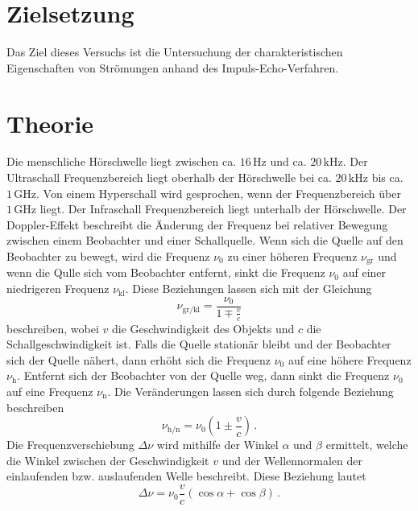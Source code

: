 \section{Zielsetzung}
\label{sec:Zielsetzung}
\nocite{anleitungUS3}
Das Ziel dieses Versuchs ist die Untersuchung der charakteristischen Eigenschaften von Strömungen anhand des Impuls-Echo-Verfahren.

\section{Theorie}
\label{sec:Theorie}
Die menschliche Hörschwelle liegt zwischen ca. $16\,\unit{\hertz}$ und ca. $20\,\unit{\kilo\hertz}$. Der Ultraschall Frequenzbereich
liegt oberhalb der Hörschwelle bei ca. $20\,\unit{\kilo\hertz}$ bis ca. $1\,\unit{\giga\hertz}$. Von einem Hyperschall wird gesprochen, wenn
der Frequenzbereich über $1\,\unit{\giga\hertz}$ liegt. Der Infraschall Frequenzbereich liegt unterhalb der Hörschwelle. 
Der Doppler-Effekt beschreibt die Änderung der Frequenz bei relativer Bewegung zwischen einem Beobachter und einer Schallquelle. 
Wenn sich die Quelle auf den Beobachter zu bewegt, wird die Frequenz $\nu_0$ zu einer höheren Frequenz $\nu_{\text{gr}}$ und wenn die
Qulle sich vom Beobachter entfernt, sinkt die Frequenz $\nu_0$ auf einer niedrigeren Frequenz $\nu_{\text{kl}}$. Diese Beziehungen lassen sich mit
der Gleichung
\begin{equation}
    \nu_{\text{gr/kl}} = \frac{\nu_0}{1 \mp \frac{v}{c}}
    \label{eqn:Frequenz_Quelle-Beobachter}
\end{equation}
beschreiben, wobei $v$ die Geschwindigkeit des Objekts und $c$ die Schallgeschwindigkeit ist. Falls die Quelle stationär bleibt und der Beobachter sich der Quelle nähert, dann erhöht sich die Frequenz $\nu_0$ auf eine höhere Frequenz
$\nu_{\text{h}}$. Entfernt sich der Beobachter von der Quelle weg, dann sinkt die Frequenz $\nu_0$ auf eine Frequenz $\nu_{\text{n}}$. Die Veränderungen lassen sich
durch folgende Beziehung beschreiben 
\begin{equation}
    \nu_{\text{h/n}} = \nu_0 \left( 1 \pm \frac{v}{c}\right)\,.
    \label{eqn:Frequenz_Beobachter-Quelle}
\end{equation}
Die Frequenzverschiebung $\Delta \nu$ wird mithilfe der Winkel $\alpha$ und $\beta$ ermittelt, welche die Winkel zwischen der Geschwindigkeit $v$ und der
Wellennormalen der einlaufenden bzw. auslaufenden Welle beschreibt. Diese Beziehung lautet 
\begin{equation}
    \Delta \nu = \nu_0 \frac{v}{c} \left(\cos \alpha + \cos \beta\right)\,.
    \label{eqn:Frequenzverschiebung}
\end{equation}
